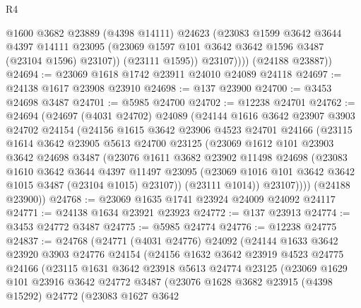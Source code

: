 \begin{lexlean}{R4}
\begin{coremodule}
                @1600
                @3682
                @23889
                (@4398 @14111)
                @24623
                (@23083
                  @1599
                  @3642
                  @3644
                  @4397
                  @14111
                  @23095
                  (@23069 @1597 @101 @3642 @3642 @1596 @3487 (@23104 @1596) @23107))
                (@23111 @1595))
              @23107))))
      (@24188 @23887))
@24694 := @23069 @1618 @1742 @23911 @24010 @24089 @24118
@24697 := @24138 @1617 @23908 @23910
@24698 := @137 @23900
@24700 := @3453 @24698 @3487
@24701 := @5985 @24700
@24702 := @12238 @24701
@24762 := @24694
    (@24697
      (@4031 @24702)
      @24089
      (@24144
        @1616
        @3642
        @23907
        @3903
        @24702
        @24154
        (@24156
          @1615
          @3642
          @23906
          @4523
          @24701
          @24166
          (@23115
            @1614
            @3642
            @23905
            @5613
            @24700
            @23125
            (@23069
              @1612
              @101
              @23903
              @3642
              @24698
              @3487
              (@23076
                @1611
                @3682
                @23902
                @11498
                @24698
                (@23083
                  @1610
                  @3642
                  @3644
                  @4397
                  @11497
                  @23095
                  (@23069 @1016 @101 @3642 @3642 @1015 @3487 (@23104 @1015) @23107))
                (@23111 @1014))
              @23107))))
      (@24188 @23900))
@24768 := @23069 @1635 @1741 @23924 @24009 @24092 @24117
@24771 := @24138 @1634 @23921 @23923
@24772 := @137 @23913
@24774 := @3453 @24772 @3487
@24775 := @5985 @24774
@24776 := @12238 @24775
@24837 := @24768
    (@24771
      (@4031 @24776)
      @24092
      (@24144
        @1633
        @3642
        @23920
        @3903
        @24776
        @24154
        (@24156
          @1632
          @3642
          @23919
          @4523
          @24775
          @24166
          (@23115
            @1631
            @3642
            @23918
            @5613
            @24774
            @23125
            (@23069
              @1629
              @101
              @23916
              @3642
              @24772
              @3487
              (@23076
                @1628
                @3682
                @23915
                (@4398 @15292)
                @24772
                (@23083
                  @1627
                  @3642

\end{coremodule}
\end{lexlean}
